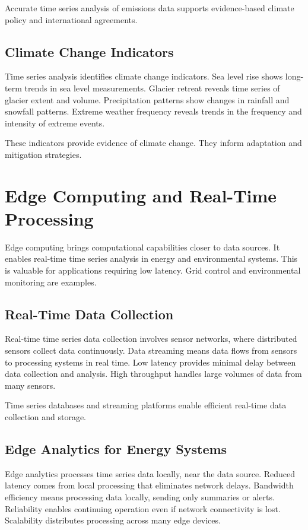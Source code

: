 Accurate time series analysis of emissions data supports evidence-based climate policy and international agreements.

\subsection{Climate Change Indicators}

Time series analysis identifies climate change indicators. Sea level rise shows long-term trends in sea level measurements. Glacier retreat reveals time series of glacier extent and volume. Precipitation patterns show changes in rainfall and snowfall patterns. Extreme weather frequency reveals trends in the frequency and intensity of extreme events.

These indicators provide evidence of climate change. They inform adaptation and mitigation strategies.

\section{Edge Computing and Real-Time Processing}

Edge computing brings computational capabilities closer to data sources. It enables real-time time series analysis in energy and environmental systems. This is valuable for applications requiring low latency. Grid control and environmental monitoring are examples.

\subsection{Real-Time Data Collection}

Real-time time series data collection involves sensor networks, where distributed sensors collect data continuously. Data streaming means data flows from sensors to processing systems in real time. Low latency provides minimal delay between data collection and analysis. High throughput handles large volumes of data from many sensors.

Time series databases and streaming platforms enable efficient real-time data collection and storage.

\subsection{Edge Analytics for Energy Systems}

Edge analytics processes time series data locally, near the data source. Reduced latency comes from local processing that eliminates network delays. Bandwidth efficiency means processing data locally, sending only summaries or alerts. Reliability enables continuing operation even if network connectivity is lost. Scalability distributes processing across many edge devices.


